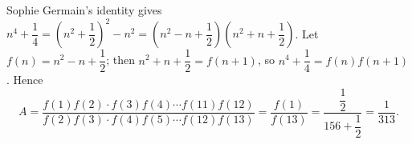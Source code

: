 Sophie Germain's identity gives $n^4+\dfrac{1}{4}=\left(n^2+\dfrac{1}{2}\right)^2-n^2=\left(n^2-n+\dfrac{1}{2}\right)\left(n^2+n+\dfrac{1}{2}\right)$. Let $f(n)=n^2-n+\dfrac{1}{2}$; then $n^2+n+\dfrac{1}{2}=f(n+1)$, so $n^4+\dfrac{1}{4}=f(n)f(n+1)$. Hence
\[
A=\dfrac{f(1)f(2)\cdot f(3)f(4)\cdots f(11)f(12)}{f(2)f(3)\cdot f(4)f(5)\cdots f(12)f(13)}=\dfrac{f(1)}{f(13)}=\dfrac{\dfrac{1}{2}}{156+\dfrac{1}{2}}=\boxed{\dfrac{1}{313}}.
\]
